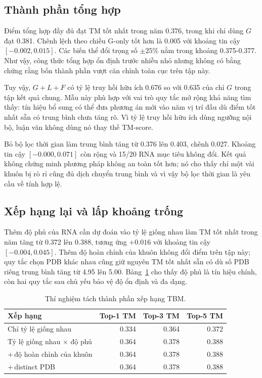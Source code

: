 \documentclass[12pt,a4paper,oneside]{report}
\begin{document}
\subsection{Thành phần tổng hợp}

Điểm tổng hợp đầy đủ đạt TM tốt nhất trong năm 0.376, trong khi chỉ dùng $G$ đạt 0.381. Chênh lệch
theo chiều G-only tốt hơn là 0.005 với khoảng tin cậy
$[-0.002,0.015]$. Các biến thể đổi trọng số $\pm25\%$ nằm trong khoảng
0.375-0.377. Như vậy, công thức tổng hợp ổn định trước nhiễu nhỏ nhưng không có
bằng chứng rằng bốn thành phần vượt căn chỉnh toàn cục trên tập này.

Tuy vậy, $G+L+F$ có tỷ lệ truy hồi hữu ích 0.676 so với 0.635 của chỉ $G$ trong tập kết quả chung.
Mẫu này phù hợp với vai trò quy tắc mở rộng khả năng tìm thấy: tín hiệu bổ sung có thể đưa phương án mới
vào năm vị trí đầu dù điểm tốt nhất sẵn có trung bình chưa tăng rõ. Vì tỷ lệ truy hồi hữu ích dùng ngưỡng nội bộ, luận
văn không dùng nó thay thế TM-score.

Bỏ bộ lọc thời gian làm trung bình tăng từ 0.376 lên 0.403, chênh 0.027. Khoảng tin
cậy $[-0.000,0.071]$ còn rộng và 15/20 RNA mục tiêu không đổi. Kết quả không chứng minh
phương pháp không an toàn tốt hơn; nó cho thấy chỉ một vài khuôn bị rò rỉ cũng đủ dịch
chuyển trung bình và vì vậy bộ lọc thời gian là yêu cầu về tính hợp lệ.

\subsection{Xếp hạng lại và lấp khoảng trống}

Thêm độ phủ của RNA cần dự đoán vào tỷ lệ giống nhau làm TM tốt nhất trong năm tăng từ 0.372 lên 0.388, tương ứng
$+0.016$ với khoảng tin cậy $[-0.004,0.045]$. Thêm độ hoàn chỉnh của khuôn không đổi
điểm trên tập này; quy tắc chọn PDB khác nhau cũng giữ nguyên TM tốt nhất sẵn có dù số
PDB riêng trung bình tăng từ 4.95 lên 5.00. Bảng~\ref{tab:tbm_rerank_vi} cho thấy độ phủ
là tín hiệu chính, còn hai quy tắc sau chủ yếu bảo vệ độ ổn định và đa dạng.

\begin{table}[H]
\centering
\caption{Thí nghiệm tách thành phần xếp hạng TBM.}
\label{tab:tbm_rerank_vi}
\begin{tabular}{lrrr}
\toprule
Xếp hạng & Top-1 TM & Top-3 TM & Top-5 TM \\
\midrule
Chỉ tỷ lệ giống nhau & 0.334 & 0.364 & 0.372 \\
Tỷ lệ giống nhau $\times$ độ phủ & 0.364 & 0.378 & 0.388 \\
$+\,$độ hoàn chỉnh của khuôn & 0.364 & 0.378 & 0.388 \\
$+\,$distinct PDB & 0.364 & 0.378 & 0.388 \\
\bottomrule
\end{tabular}
\end{table}
\end{document}
